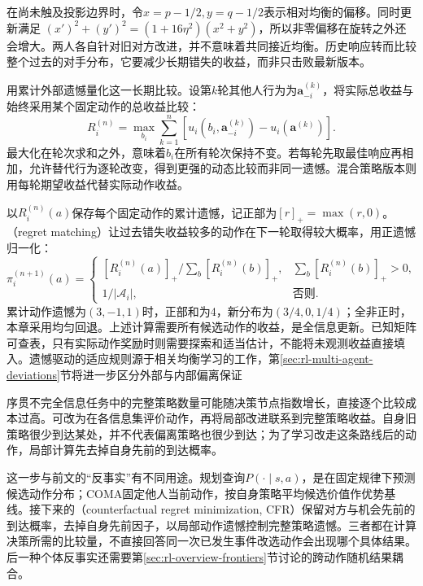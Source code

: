 在尚未触及投影边界时，令$x=p-1/2,y=q-1/2$表示相对均衡的偏移。同时更新满足
$(x')^2+(y')^2=(1+16\eta^2)(x^2+y^2)$，所以非零偏移在旋转之外还会增大。两人各自针对旧对方改进，并不意味着共同接近均衡。历史响应转而比较整个过去的对手分布，它要减少长期错失的收益，而非只击败最新版本。

用累计外部遗憾量化这一长期比较。设第$k$轮其他人行为为$\bm a_{-i}^{(k)}$，将实际总收益与始终采用某个固定动作的总收益比较：
\begin{equation}
 R_i^{(n)}
 =\max_{b_i}\sum_{k=1}^{n}
   [u_i(b_i,\bm a_{-i}^{(k)})
        -u_i(\bm a^{(k)})].
 \label{eq:rl-multi-agent-external-regret}
\end{equation}
最大化在轮次求和之外，意味着$b_i$在所有轮次保持不变。若每轮先取最佳响应再相加，允许替代行为逐轮改变，得到更强的动态比较而非同一遗憾。混合策略版本则用每轮期望收益代替实际动作收益。

以$R_i^{(n)}(a)$保存每个固定动作的累计遗憾，记正部为$[r]_+=\max(r,0)$。（regret matching）让过去错失收益较多的动作在下一轮取得较大概率，用正遗憾归一化：
\[
 \pi_i^{(n+1)}(a)=
 \begin{cases}
 [R_i^{(n)}(a)]_+/\sum_b[R_i^{(n)}(b)]_+,
       &\sum_b[R_i^{(n)}(b)]_+>0,\\
 1/|\mathcal A_i|,&\text{否则}.
 \end{cases}
\]
累计动作遗憾为$(3,-1,1)$时，正部和为4，新分布为$(3/4,0,1/4)$；全非正时，本章采用均匀回退。上述计算需要所有候选动作的收益，是全信息更新。已知矩阵可查表，只有实际动作奖励时则需要探索和适当估计，不能将未观测收益直接填入。遗憾驱动的适应规则源于相关均衡学习的工作，第\ref{sec:rl-multi-agent-deviations}节将进一步区分外部与内部偏离保证

序贯不完全信息任务中的完整策略数量可能随决策节点指数增长，直接逐个比较成本过高。可改为在各信息集评价动作，再将局部改进联系到完整策略收益。自身旧策略很少到达某处，并不代表偏离策略也很少到达；为了学习改走这条路线后的动作，局部计算先去掉自身先前的到达概率。

这一步与前文的“反事实”有不同用途。规划查询$P(\cdot\mid s,a)$，是在固定规律下预测候选动作分布；COMA固定他人当前动作，按自身策略平均候选价值作优势基线。接下来的（counterfactual regret minimization, CFR）保留对方与机会先前的到达概率，去掉自身先前因子，以局部动作遗憾控制完整策略遗憾。三者都在计算决策所需的比较量，不直接回答同一次已发生事件改选动作会出现哪个具体结果。后一种个体反事实还需要第\ref{sec:rl-overview-frontiers}节讨论的跨动作随机结果耦合。

